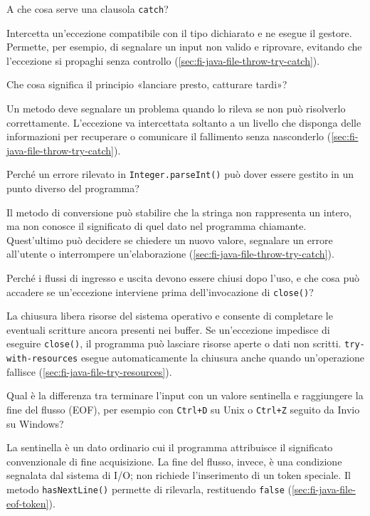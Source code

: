 \begin{exercise}
\label{ex:fi-esercizi-java-file-catch}
A che cosa serve una clausola \texttt{catch}?
\end{exercise}

Intercetta un'eccezione compatibile con il tipo dichiarato e
ne esegue il gestore. Permette, per esempio, di segnalare un
input non valido e riprovare, evitando che l'eccezione si
propaghi senza controllo
(\cref{sec:fi-java-file-throw-try-catch}).

\begin{exercise}
\label{ex:fi-esercizi-java-file-lanciare-catturare}
Che cosa significa il principio «lanciare presto, catturare tardi»?
\end{exercise}

Un metodo deve segnalare un problema quando lo rileva se non può
risolverlo correttamente. L'eccezione va intercettata soltanto
a un livello che disponga delle informazioni per recuperare
o comunicare il fallimento senza nasconderlo
(\cref{sec:fi-java-file-throw-try-catch}).

\begin{exercise}
\label{ex:fi-esercizi-java-file-parseint}
Perché un errore rilevato in \texttt{Integer.parseInt()} può
dover essere gestito in un punto diverso del programma?
\end{exercise}

Il metodo di conversione può stabilire che la stringa non
rappresenta un intero, ma non conosce il significato di quel dato
nel programma chiamante. Quest'ultimo può decidere se chiedere un
nuovo valore, segnalare un errore all'utente o interrompere
un'elaborazione
(\cref{sec:fi-java-file-throw-try-catch}).

\begin{exercise}
\label{ex:fi-esercizi-java-file-close}
Perché i flussi di ingresso e uscita devono essere chiusi dopo
l'uso, e che cosa può accadere se un'eccezione interviene
prima dell'invocazione di \texttt{close()}?
\end{exercise}

La chiusura libera risorse del sistema operativo e consente
di completare le eventuali scritture ancora presenti nei buffer.
Se un'eccezione impedisce di eseguire \texttt{close()}, il programma può lasciare
risorse aperte o dati non scritti. \texttt{try-with-resources}
esegue automaticamente la chiusura anche quando un'operazione
fallisce
(\cref{sec:fi-java-file-try-resources}).

\begin{exercise}
\label{ex:fi-esercizi-java-file-sentinella-eof}
Qual è la differenza tra terminare l'input con un valore
sentinella e raggiungere la fine del flusso (EOF), per esempio
con \texttt{Ctrl+D} su Unix o \texttt{Ctrl+Z} seguito da Invio
su Windows?
\end{exercise}

La sentinella è un dato ordinario cui il programma attribuisce
il significato convenzionale di fine acquisizione. La fine del
flusso, invece, è una condizione segnalata dal sistema di I/O;
non richiede l'inserimento di un token speciale. Il metodo
\texttt{hasNextLine()} permette di rilevarla, restituendo
\texttt{false}
(\cref{sec:fi-java-file-eof-token}).
